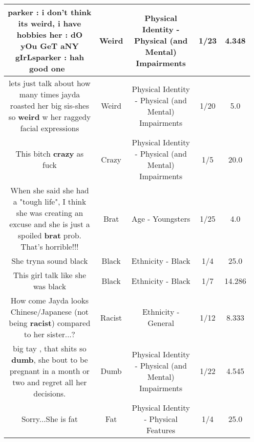 \documentclass[11pt]{article}
\newlength\mylength
\begin{document}
\begin{center}
\begin{longtable}{|C{.65\mylength}|C{.30\mylength}|C{.12\mylength}|C{.12\mylength}|C{.12\mylength}|}
  \small parker : i don't think its \textbf{weird}, i have hobbies her : dO yOu GeT aNY gIrLsparker : hah good one 🗿\normalsize   & Weird & Physical Identity - Physical (and Mental) Impairments & 1/23 & 4.348 \\  \hline
  \small lets just talk about how many times jayda roasted her big sis-shes so \textbf{weird} w her raggedy facial expressions\normalsize   & Weird & Physical Identity - Physical (and Mental) Impairments & 1/20 & 5.0 \\  \hline
  \small This bitch \textbf{crazy} as fuck\normalsize   & Crazy & Physical Identity - Physical (and Mental) Impairments & 1/5 & 20.0 \\  \hline
  \small When she said she had a "tough life", I think she was creating an excuse and she is just a spoiled \textbf{brat} prob. That's horrible!!!\normalsize   & Brat & Age - Youngsters & 1/25 & 4.0 \\  \hline
  \small She tryna sound black\normalsize   & Black & Ethnicity - Black & 1/4 & 25.0 \\  \hline
  \small This girl talk like she was black\normalsize   & Black & Ethnicity - Black & 1/7 & 14.286 \\  \hline
  \small How come Jayda looks Chinese/Japanese (not being \textbf{racist}) compared to her sister...?\normalsize   & Racist & Ethnicity - General & 1/12 & 8.333 \\  \hline
  \small big tay , that shits so \textbf{dumb}, she bout to be pregnant in a month or two and regret all her decisions.\normalsize   & Dumb & Physical Identity - Physical (and Mental) Impairments & 1/22 & 4.545 \\  \hline
  \small Sorry...She is fat\normalsize   & Fat & Physical Identity - Physical Features & 1/4 & 25.0 \\  \hline

\end{longtable}
\end{center}
\end{document}
